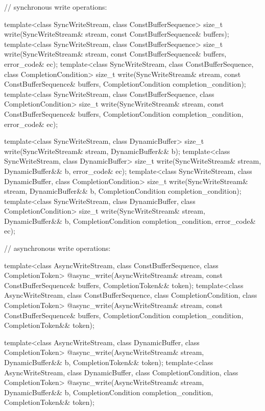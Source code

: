 \begin{codeblock}
{{{{  // synchronous write operations:

  template<class SyncWriteStream, class ConstBufferSequence>
    size_t write(SyncWriteStream& stream,
                 const ConstBufferSequence& buffers);
  template<class SyncWriteStream, class ConstBufferSequence>
    size_t write(SyncWriteStream& stream,
                 const ConstBufferSequence& buffers, error_code& ec);
  template<class SyncWriteStream, class ConstBufferSequence,
    class CompletionCondition>
      size_t write(SyncWriteStream& stream,
                   const ConstBufferSequence& buffers,
                   CompletionCondition completion_condition);
  template<class SyncWriteStream, class ConstBufferSequence,
    class CompletionCondition>
      size_t write(SyncWriteStream& stream,
                   const ConstBufferSequence& buffers,
                   CompletionCondition completion_condition,
                   error_code& ec);

  template<class SyncWriteStream, class DynamicBuffer>
    size_t write(SyncWriteStream& stream, DynamicBuffer&& b);
  template<class SyncWriteStream, class DynamicBuffer>
    size_t write(SyncWriteStream& stream, DynamicBuffer&& b, error_code& ec);
  template<class SyncWriteStream, class DynamicBuffer, class CompletionCondition>
    size_t write(SyncWriteStream& stream, DynamicBuffer&& b,
                 CompletionCondition completion_condition);
  template<class SyncWriteStream, class DynamicBuffer, class CompletionCondition>
    size_t write(SyncWriteStream& stream, DynamicBuffer&& b,
                 CompletionCondition completion_condition, error_code& ec);

  // asynchronous write operations:

  template<class AsyncWriteStream, class ConstBufferSequence,
    class CompletionToken>
      @\DEDUCED@ async_write(AsyncWriteStream& stream,
                          const ConstBufferSequence& buffers,
                          CompletionToken&& token);
  template<class AsyncWriteStream, class ConstBufferSequence,
    class CompletionCondition, class CompletionToken>
      @\DEDUCED@ async_write(AsyncWriteStream& stream,
                          const ConstBufferSequence& buffers,
                          CompletionCondition completion_condition,
                          CompletionToken&& token);

  template<class AsyncWriteStream, class DynamicBuffer, class CompletionToken>
    @\DEDUCED@ async_write(AsyncWriteStream& stream,
                     DynamicBuffer&& b, CompletionToken&& token);
  template<class AsyncWriteStream, class DynamicBuffer,
    class CompletionCondition, class CompletionToken>
      @\DEDUCED@ async_write(AsyncWriteStream& stream,
                          DynamicBuffer&& b,
                          CompletionCondition completion_condition,
                          CompletionToken&& token);

}}}}
\end{codeblock}
